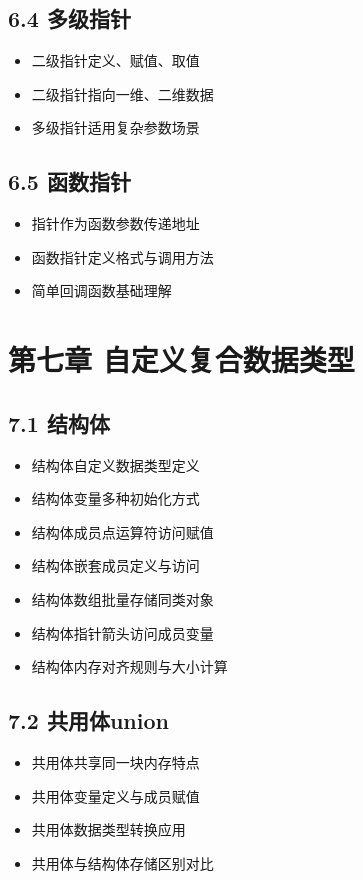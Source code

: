 \subsection*{6.4 多级指针}
\begin{itemize}
\item 二级指针定义、赋值、取值
\item 二级指针指向一维、二维数据
\item 多级指针适用复杂参数场景
\end{itemize}

\subsection*{6.5 函数指针}
\begin{itemize}
\item 指针作为函数参数传递地址
\item 函数指针定义格式与调用方法
\item 简单回调函数基础理解
\end{itemize}

\section*{第七章 自定义复合数据类型}
\subsection*{7.1 结构体}
\begin{itemize}
\item 结构体自定义数据类型定义
\item 结构体变量多种初始化方式
\item 结构体成员点运算符访问赋值
\item 结构体嵌套成员定义与访问
\item 结构体数组批量存储同类对象
\item 结构体指针箭头访问成员变量
\item 结构体内存对齐规则与大小计算
\end{itemize}

\subsection*{7.2 共用体union}
\begin{itemize}
\item 共用体共享同一块内存特点
\item 共用体变量定义与成员赋值
\item 共用体数据类型转换应用
\item 共用体与结构体存储区别对比
\end{itemize}

